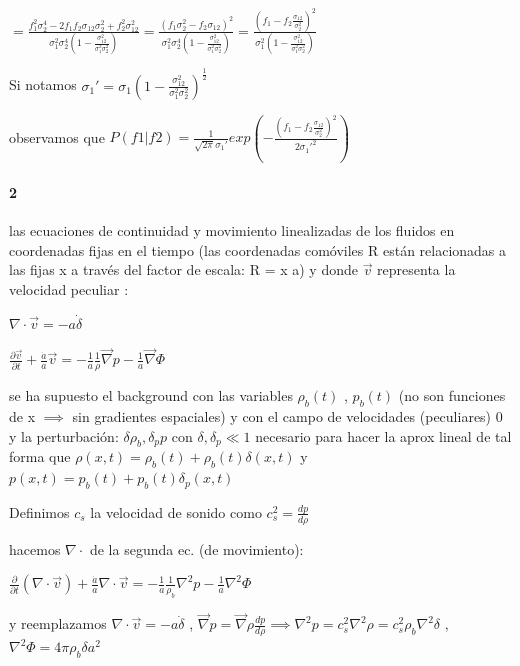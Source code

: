 \documentclass[12pt]{book}
\begin{document}
$= \frac{f_1^2 \sigma_2^4  - 2 f_1 f_2 \sigma_{12} \sigma_2^2   + f_2^2 \sigma_{12}^2 }
{\sigma_1^2 \sigma_2^4(1- \frac{\sigma_{12}^2}{\sigma_1^2 \sigma_2^2 })}
= \frac{(f_1 \sigma_2^2  - f_2 \sigma_{12} )^2}
{\sigma_1^2 \sigma_2^4(1- \frac{\sigma_{12}^2}{\sigma_1^2 \sigma_2^2 })}
= \frac{(f_1  - f_2 \frac{\sigma_{12}}{\sigma_2^2} )^2}
{\sigma_1^2 (1- \frac{\sigma_{12}^2}{\sigma_1^2 \sigma_2^2 })}
$

Si notamos $\sigma_1' = \sigma_1(1- \frac{\sigma_{12}^2}{\sigma_1^2 \sigma_2^2 })^{\frac{1}{2}}$

observamos que 
$P(f1|f2) = \frac{1}{\sqrt{2\pi}\sigma_1'} 
exp(-\frac{(f_1  - f_2 \frac{\sigma_{12}}{\sigma_2^2} )^2}{2 \sigma_1'^2 })$


\paragraph{2}

las ecuaciones de continuidad y movimiento linealizadas de los fluidos en coordenadas fijas en el tiempo (las coordenadas
comóviles R están relacionadas a las fijas x a través del factor de escala: R = x a) y donde  $\vec{v}$ representa la velocidad peculiar :

$\nabla \cdot \vec{v} = -a \dot{\delta}$

$\frac{\partial \vec{v}}{\partial t} + \frac{\dot{a}}{a} \vec{v} = -\frac{1}{a} \frac{1}{\rho} \vec\nabla{p} - \frac{1}{a} \vec{\nabla}\Phi$

se ha supuesto el background con las variables $\rho_b(t)$ , $p_b(t)$ (no son funciones de x $\implies $ 
sin gradientes espaciales) y con el campo de velocidades (peculiares) 0
y la perturbación: $\delta \rho_b, \delta_p p$ con $\delta, \delta_p \ll 1$ 
necesario para hacer la aprox lineal de tal forma que $\rho(x,t) = \rho_b(t) + \rho_b(t) \delta(x,t)$ y 
$p(x,t) = p_b(t) + p_b(t) \delta_p(x,t)$ 

Definimos $c_s$ la velocidad de sonido  como $c_s^2 = \frac{dp}{d\rho}$

hacemos $\nabla \cdot $ de la segunda ec. (de movimiento):

$\frac{\partial }{\partial t} (\nabla \cdot \vec{v})+ \frac{\dot{a}}{a} \nabla \cdot \vec{v} = -\frac{1}{a} \frac{1}{\rho_b} \nabla^2{p} - \frac{1}{a} {\nabla}^2\Phi$

y reemplazamos $\nabla \cdot \vec{v} = -a \dot{\delta} $ ,  
$ \vec{\nabla}{p} = \vec{\nabla}{\rho}\frac{dp}{d\rho} \implies \nabla^2{p} = c_s^2 \nabla^2{\rho} = c_s^2 \rho_b \nabla^2 \delta$  , 
$\nabla^2 \Phi = 4 \pi \rho_b \delta a^2$ 
\end{document}
